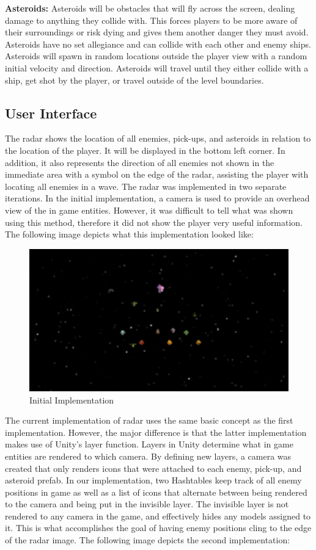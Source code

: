 \documentclass[12pt]{article}       %
\def\hs{\hspace{15pt}}
\begin{document}
	{\bf Asteroids:}  Asteroids will be obstacles that will fly across the screen, dealing damage to anything they collide with. This forces players to be more aware of their surroundings or risk dying and gives them another danger they must avoid. Asteroids have no set allegiance and can collide with each other and enemy ships. Asteroids will spawn in random locations outside the player view with a random initial velocity and direction. Asteroids will travel until they either collide with a ship, get shot by the player, or travel outside of the level boundaries.

\subsection{User Interface} %

	\hs {\bf Radar:} The radar shows the location of all enemies, pick-ups, and asteroids in relation to the location of the player. It will be displayed in the bottom left corner. In addition, it also represents the direction of all enemies not shown in the immediate area with a symbol on the edge of the radar, assisting the player with locating all enemies in a wave. The radar was implemented in two separate iterations. In the initial implementation, a camera is used to provide an overhead view of the in game entities. However, it was difficult to tell what was shown using this method, therefore it did not show the player very useful information. The following image depicts what this implementation looked like:

\begin{figure} [H]
\centering
\includegraphics[width=4.5in]{minimapExample1.png}
\caption{Initial Implementation} \label{RadarOne}
\end{figure}

	The current implementation of radar uses the same basic concept as the first implementation. However, the major difference is that the latter implementation makes use of Unity's layer function. Layers in Unity determine what in game entities are rendered to which camera. By defining new layers, a camera was created that only renders icons that were attached to each enemy, pick-up, and asteroid prefab. In our implementation, two Hashtables keep track of all enemy positions in game as well as a list of icons that alternate between being rendered to the camera and being put in the invisible layer. The invisible layer is not rendered to any camera in the game, and effectively hides any models assigned to it. This is what accomplishes the goal of having enemy positions cling to the edge of the radar image. The following image depicts the second implementation:
\end{document}
